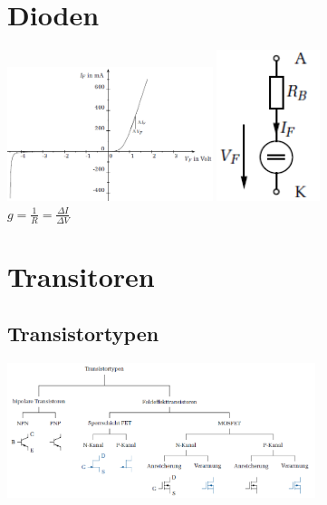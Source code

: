 
\begin{multicols}{2}
	\section{Dioden}
	\includegraphics[width=6cm]{bilder/DiodenKennlinie}
	\includegraphics[width=3cm]{bilder/DiodenKleinsignal}\\
	$g = \frac{1}{R}= \frac{\Delta I}{\Delta V}$
	\columnbreak
	
	\section{Transitoren}
		\subsection{Transistortypen}
		\includegraphics[width=9cm]{bilder/Transistortypen.png}
\end{multicols}

